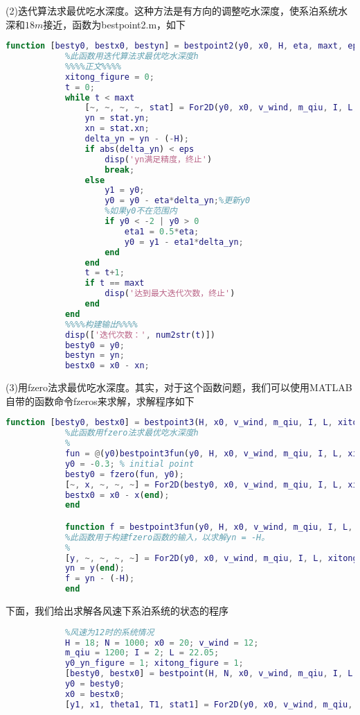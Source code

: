             \par
            (2)迭代算法求最优吃水深度。这种方法是有方向的调整吃水深度，使系泊系统水深和$18m$接近，函数为bestpoint2.m，如下
            \begin{lstlisting}[language = Matlab]
            function [besty0, bestx0, bestyn] = bestpoint2(y0, x0, H, eta, maxt, eps, v_wind, m_qiu, I, L)
            %此函数用迭代算法求最优吃水深度h
            %%%%正文%%%%
            xitong_figure = 0;
            t = 0;
            while t < maxt
                [~, ~, ~, ~, stat] = For2D(y0, x0, v_wind, m_qiu, I, L, xitong_figure);
                yn = stat.yn;
                xn = stat.xn;
                delta_yn = yn - (-H);
                if abs(delta_yn) < eps
                    disp('yn满足精度，终止')
                    break;
                else
                    y1 = y0;
                    y0 = y0 - eta*delta_yn;%更新y0
                    %如果y0不在范围内
                    if y0 < -2 | y0 > 0
                        eta1 = 0.5*eta;
                        y0 = y1 - eta1*delta_yn;
                    end
                end
                t = t+1;
                if t == maxt
                    disp('达到最大迭代次数，终止')
                end
            end
            %%%%构建输出%%%%
            disp(['迭代次数：', num2str(t)])
            besty0 = y0;
            bestyn = yn;
            bestx0 = x0 - xn;
            \end{lstlisting}
            \par
            (3)用fzero法求最优吃水深度。其实，对于这个函数问题，我们可以使用MATLAB自带的函数命令fzeros来求解，求解程序如下
            \begin{lstlisting}[language = Matlab]
            function [besty0, bestx0] = bestpoint3(H, x0, v_wind, m_qiu, I, L, xitong_figure)
            %此函数用fzero法求最优吃水深度h
            %
            fun = @(y0)bestpoint3fun(y0, H, x0, v_wind, m_qiu, I, L, xitong_figure);
            y0 = -0.3; % initial point
            besty0 = fzero(fun, y0);
            [~, x, ~, ~, ~] = For2D(besty0, x0, v_wind, m_qiu, I, L, xitong_figure);
            bestx0 = x0 - x(end);
            end

            function f = bestpoint3fun(y0, H, x0, v_wind, m_qiu, I, L, xitong_figure)
            %此函数用于构建fzero函数的输入，以求解yn = -H。
            %
            [y, ~, ~, ~, ~] = For2D(y0, x0, v_wind, m_qiu, I, L, xitong_figure);
            yn = y(end);
            f = yn - (-H);
            end
            \end{lstlisting}
            \par
            下面，我们给出求解各风速下系泊系统的状态的程序
            \begin{lstlisting}[language = Matlab]
            %% 利用离散枚举法计算bestx0, besty0情况下的系统信息及系统图形
            %风速为12时的系统情况
            H = 18; N = 1000; x0 = 20; v_wind = 12;
            m_qiu = 1200; I = 2; L = 22.05;
            y0_yn_figure = 1; xitong_figure = 1;
            [besty0, bestx0] = bestpoint(H, N, x0, v_wind, m_qiu, I, L, y0_yn_figure);
            y0 = besty0;
            x0 = bestx0;
            [y1, x1, theta1, T1, stat1] = For2D(y0, x0, v_wind, m_qiu, I, L, xitong_figure);
            \end{lstlisting}
